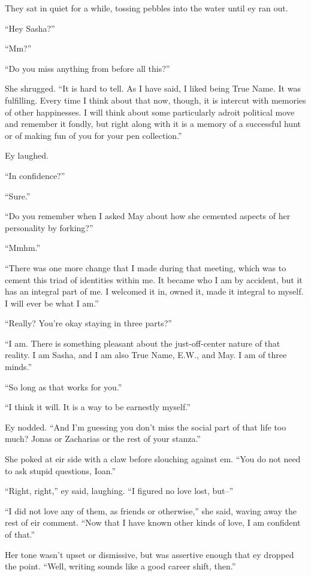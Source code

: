 They sat in quiet for a while, tossing pebbles into the water until ey ran out.

``Hey Sasha?''

``Mm?''

``Do you miss anything from before all this?''

She shrugged. ``It is hard to tell. As I have said, I liked being True Name. It was fulfilling. Every time I think about that now, though, it is intercut with memories of other happinesses. I will think about some particularly adroit political move and remember it fondly, but right along with it is a memory of a successful hunt or of making fun of you for your pen collection.''

Ey laughed.

``In confidence?''

``Sure.''

``Do you remember when I asked May about how she cemented aspects of her personality by forking?''

``Mmhm.''

``There was one more change that I made during that meeting, which was to cement this triad of identities within me. It became who I am by accident, but it has an integral part of me. I welcomed it in, owned it, made it integral to myself. I will ever be what I am.''

``Really? You're okay staying in three parts?''

``I am. There is something pleasant about the just-off-center nature of that reality. I am Sasha, and I am also True Name, E.W., and May. I am of three minds.''

``So long as that works for you.''

``I think it will. It is a way to be earnestly myself.''

Ey nodded. ``And I'm guessing you don't miss the social part of that life too much? Jonas or Zacharias or the rest of your stanza.''

She poked at eir side with a claw before slouching against em. ``You do not need to ask stupid questions, Ioan.''

``Right, right,'' ey said, laughing. ``I figured no love lost, but--''

``I did not love any of them, as friends or otherwise,'' she said, waving away the rest of eir comment. ``Now that I have known other kinds of love, I am confident of that.''

Her tone wasn't upset or dismissive, but was assertive enough that ey dropped the point. ``Well, writing sounds like a good career shift, then.''

